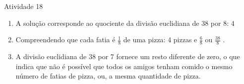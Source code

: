 \begin{multicols}{2}
\begin{resposta*}{Atividade 18}
\begin{enumerate} [\quad a)] %
    \item       A solução corresponde ao quociente da divisão euclidiana de 38 por 8: 4
    \item       Compreendendo que cada fatia é       $\frac{1}{8}$        de uma pizza: 4 pizzas e       $\frac{6}{8}$       ou       $\frac{38}{8}$      .
    \item       A divisão euclidiana de 38 por 7 fornece um resto diferente de zero, o que indica que não é possível que todos os amigos tenham comido o mesmo número de fatias de pizza, ou, a mesma quantidade de pizza.
\end{enumerate} %
\end{resposta*}


\end{multicols}
